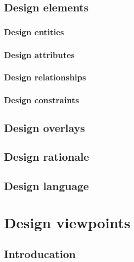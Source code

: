 \documentclass{scrreprt}
\begin{document}
\subsection{Design elements}

\subsubsection{Design entities}

\subsubsection{Design attributes}





\subsubsection{Design relationships}

\subsubsection{Design constraints}

\subsection{Design overlays}

\subsection{Design rationale}

\subsection{Design language}

\section{Design viewpoints}

\subsection{Introducation}
\end{document}
